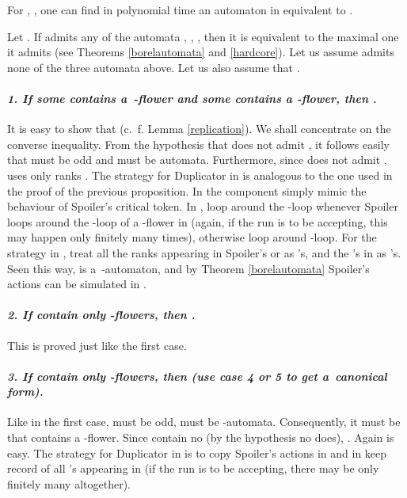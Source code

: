 \documentclass{LMCS}
\begin{document}
\begin{prop}\label{longrightarrow_closure} 
For , , one can find in polynomial time  an automaton in  equivalent to . 
\end{prop}

\proof Let . If  admits any of the automata , , , then it is equivalent to the maximal one it admits (see Theorems \ref{borelautomata} and \ref{hardcore}). Let us assume  admits none of the three automata above. Let us also assume that .

\paragraph{{\em  1. If some  contains a~-flower  and some  contains a -flower, then .}} It is easy to show that  (c.~f. Lemma \ref{replication}). We shall concentrate on the converse inequality. From the hypothesis that  does not admit , it follows easily that  must be odd and  must be  automata. Furthermore, since  does not admit ,  uses only ranks . The strategy for Duplicator in  is analogous to the one used in the proof of the previous proposition. In the component  simply mimic the behaviour of Spoiler's critical token. In , loop around the -loop whenever Spoiler loops around the -loop of a -flower in  (again, if the run is to be accepting, this may happen only finitely many times), otherwise loop around -loop. For the strategy in , treat all the ranks appearing in Spoiler's  or  as 's, and the 's in  as 's. Seen this way,  is a~-automaton, and by Theorem \ref{borelautomata} Spoiler's actions can be simulated in .

\paragraph{{\em 2. If  contain only -flowers, then  .}} This is proved just like the first case.

\paragraph{{\em 3. If  contain only -flowers, then   (use case 4 or 5 to get a~canonical form).}} Like in the first case,   must be odd,  must be -automata. Consequently, it must be  that contains a -flower. Since  contain no  (by the hypothesis no  does), .  Again  is easy. The strategy for Duplicator in  is to copy Spoiler's actions in  and in  keep record of all 's appearing in  (if the run is to be accepting, there may be only finitely many altogether).
\end{document}
